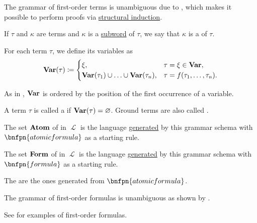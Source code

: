 \begin{definition}
\begin{thmenum}
    The grammar of first-order terms is unambiguous due to , which makes it possible to perform proofs via \hyperref[def:structural_induction]{structural induction}.

     If \( \tau \) and \( \kappa \) are terms and \( \kappa \) is a \hyperref[def:language/subword]{subword} of \( \tau \), we say that \( \kappa \) is a  of \( \tau \).

     For each term \( \tau \), we define its variables as
    \begin{equation}\label{eq:def:first_order_syntax/term_variables}
      \operatorname{\mathbf{Var}}(\tau) \coloneqq \begin{cases}
        \xi,                                                        &\tau = \xi \in \operatorname{\mathbf{Var}}, \\
        \operatorname{\mathbf{Var}}(\tau_1) \cup \ldots \cup \operatorname{\mathbf{Var}}(\tau_n), &\tau = f(\tau_1, \ldots, \tau_n).
      \end{cases}
    \end{equation}

    As in , \( \operatorname{\mathbf{Var}} \) is ordered by the position of the first occurrence of a variable.

     A term \( \tau \) is called a  if \( \operatorname{\mathbf{Var}}(\tau) = \varnothing \). Ground terms are also called .

     The set \( \operatorname{\mathbf{Atom}} \) of  in \( \mscrL \) is the language \hyperref[def:grammar_derivation/grammar_language]{generated} by this grammar schema with \( \bnfpn{atomic formula} \) as a starting rule.

     The set \( \operatorname{\mathbf{Form}} \) of  in \( \mscrL \) is the language \hyperref[def:grammar_derivation/grammar_language]{generated} by this grammar schema with \( \bnfpn{formula} \) as a starting rule.

    The  are the ones generated from \( \bnfpn{atomic formula} \).

    The grammar of first-order formulas is unambiguous as shown by .

    See  for examples of first-order formulas.


\end{thmenum}
\end{definition}
